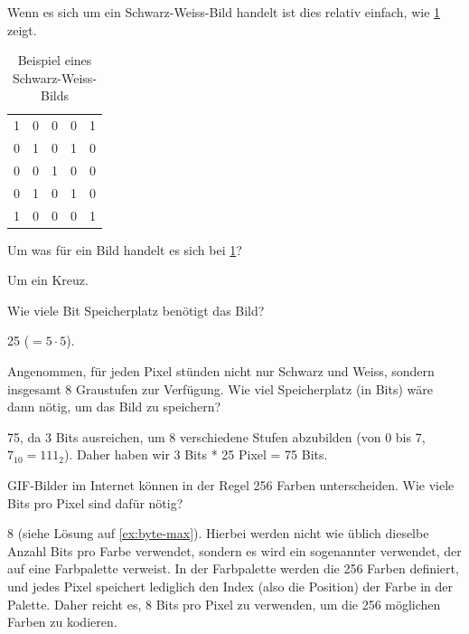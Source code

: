 Wenn es sich um ein Schwarz-Weiss-Bild handelt ist dies relativ einfach, wie \cref{table:bw-img} zeigt.

\begin{table}[H]
	\centering
	\begin{tabular}{lllll}
		1 & 0 & 0 & 0 & 1 \\
		0 & 1 & 0 & 1 & 0 \\
		0 & 0 & 1 & 0 & 0 \\
		0 & 1 & 0 & 1 & 0 \\
		1 & 0 & 0 & 0 & 1
	\end{tabular}
	\caption{Beispiel eines Schwarz-Weiss-Bilds}
	\label{table:bw-img}
\end{table}

\begin{myexercise}
	Um was für ein Bild handelt es sich bei \cref{table:bw-img}?
	\begin{myanswer}
		Um ein Kreuz.
	\end{myanswer}
\end{myexercise}

\begin{myexercise}
	Wie viele Bit Speicherplatz benötigt das Bild?
	\begin{myanswer}
		25 ($= 5\cdot 5$).
	\end{myanswer}
\end{myexercise}

\begin{myexercise}
	Angenommen, für jeden Pixel stünden nicht nur Schwarz und Weiss, sondern insgesamt 8 Graustufen zur Verfügung. Wie viel Speicherplatz (in Bits) wäre dann nötig, um das Bild zu speichern?
	\begin{myanswer}
		75, da 3 Bits ausreichen, um 8 verschiedene Stufen abzubilden (von 0 bis 7, $7_{10}=111_2$). Daher haben wir 3 Bits * 25 Pixel = 75 Bits.
	\end{myanswer}
\end{myexercise}

\begin{myexercise}
	\gls{GIF}-Bilder im Internet können in der Regel 256 Farben unterscheiden. Wie viele Bits pro Pixel sind dafür nötig?
	\begin{myanswer}
		8 (siehe Lösung auf \cref{ex:byte-max}). Hierbei werden nicht wie üblich dieselbe Anzahl Bits pro Farbe verwendet, sondern es wird ein sogenannter  verwendet, der auf eine Farbpalette verweist. In der Farbpalette werden die 256 Farben definiert, und jedes Pixel speichert lediglich den Index (also die Position) der Farbe in der Palette. Daher reicht es, 8 Bits pro Pixel zu verwenden, um die 256 möglichen Farben zu kodieren.
	\end{myanswer}
\end{myexercise}

